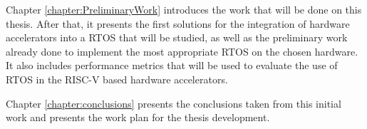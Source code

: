 Chapter \ref{chapter:PreliminaryWork} introduces the work that will be done on this thesis. After that, it presents the first solutions for the integration of hardware accelerators into a RTOS that will be studied, as well as the preliminary work already done to implement the most appropriate RTOS on the chosen hardware. It also includes performance metrics that will be used to evaluate the use of RTOS in the RISC-V based hardware accelerators.

Chapter \ref{chapter:conclusions} presents the conclusions taken from this initial work and presents the work plan for the thesis development.




